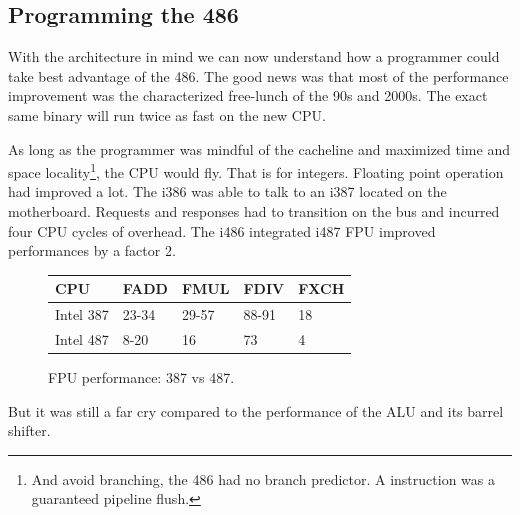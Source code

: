 \par



\begin{figure}[H]
\centering
{}
\end{figure}
\par
\begin{figure}[H]
\centering
{}
\end{figure}






\subsection{Programming the 486}
With the architecture in mind we can now understand how a programmer could take best advantage of the 486. The good news was that most of the performance improvement was the characterized free-lunch of the 90s and 2000s. The exact same binary will run twice as fast on the new CPU.\\
\par
As long as the programmer was mindful of the cacheline and maximized time and space locality\footnote{And avoid branching, the 486 had no branch predictor. A  instruction was a guaranteed pipeline flush.}, the CPU would fly. That is for integers. Floating point operation had improved a lot. The i386 was able to talk to an i387 located on the motherboard. Requests and responses had to transition on the bus and incurred four CPU cycles of overhead. The i486 integrated i487 FPU improved performances by a factor 2.\\
\par
\begin{figure}[H]
\centering
\begin{tabularx}{\textwidth}{ X  X X  X  X}
  \toprule
  \textbf{CPU} & \textbf{FADD} & \textbf{FMUL} & \textbf{FDIV} &\textbf{FXCH} \\ \bottomrule
Intel 387 & 23-34 & 29-57   & 88-91 & 18 \\
Intel 487 & 8-20  & 16   & 73 & 4 \\ \bottomrule
\end{tabularx}
\caption{FPU performance: 387 vs 487.}

\end{figure}

\par
But it was still a far cry compared to the performance of the ALU and its barrel shifter.\\

